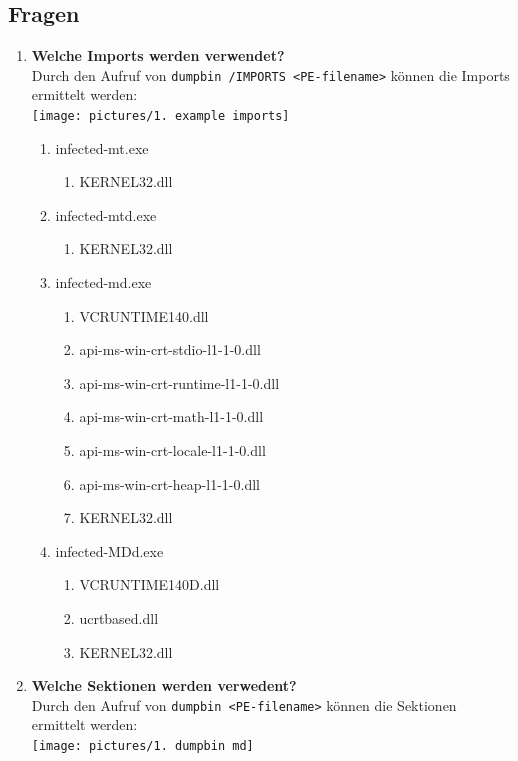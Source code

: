 \documentclass{article}
\begin{document}
	\subsection*{Fragen}
	\begin{enumerate}
		\item \textbf{Welche Imports werden verwendet?}\\
		Durch den Aufruf von \texttt{dumpbin /IMPORTS <PE-filename>} können die Imports ermittelt werden:\\
		\texttt{[image: pictures/1. example imports]}
		\begin{enumerate}
			\item infected-mt.exe
			\begin{enumerate}
				\item KERNEL32.dll
			\end{enumerate}
			\item infected-mtd.exe
			\begin{enumerate}
				\item KERNEL32.dll
			\end{enumerate}
			\item infected-md.exe
			\begin{enumerate}
				\item VCRUNTIME140.dll
				\item api-ms-win-crt-stdio-l1-1-0.dll
				\item api-ms-win-crt-runtime-l1-1-0.dll
				\item api-ms-win-crt-math-l1-1-0.dll
				\item api-ms-win-crt-locale-l1-1-0.dll
				\item api-ms-win-crt-heap-l1-1-0.dll
				\item KERNEL32.dll
			\end{enumerate}
			\item infected-MDd.exe
			\begin{enumerate}
				\item VCRUNTIME140D.dll
				\item ucrtbased.dll
				\item KERNEL32.dll
			\end{enumerate}
		\end{enumerate}
		\pagebreak
		\item \textbf{Welche Sektionen werden verwedent?}\\
		Durch den Aufruf von \texttt{dumpbin <PE-filename>} können die Sektionen ermittelt werden:\\
		\texttt{[image: pictures/1. dumpbin md]}

\end{enumerate}
\end{document}
